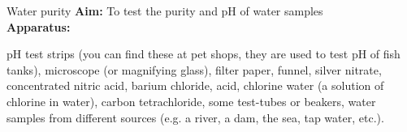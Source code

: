 \par 
\label{m38138*id08321}
            \begin{g_experiment}{Water purity}
            \nopagebreak
            \label{m38138*id08341}\noindent{}\textbf{Aim: } To test the purity and pH of water samples
\\
\label{m38138*id083244}\noindent{}\textbf{Apparatus:}\\
\begin{minipage}{.5\textwidth}
pH test strips (you can find these at pet shops, they are used to test pH of fish tanks), microscope (or magnifying glass), filter paper, funnel, silver nitrate, concentrated nitric acid, barium chloride, acid, chlorine water (a solution of chlorine in water), carbon tetrachloride, some test-tubes or beakers, water samples from different sources (e.g.\@{} a river, a dam, the sea, tap water, etc.).
\end{minipage}
\begin{minipage}{.5\textwidth}


\end{minipage}
\end{g_experiment}

